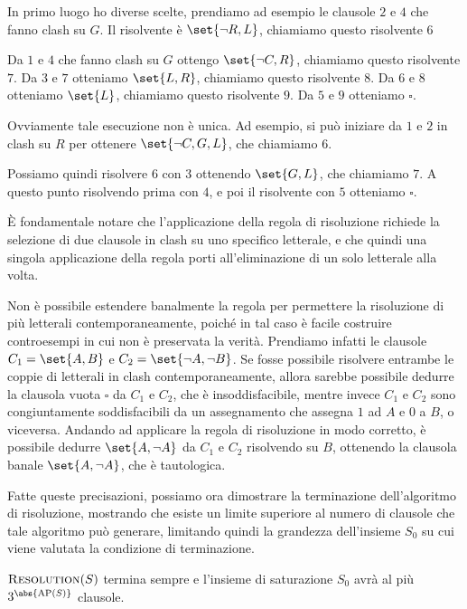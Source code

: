 \begin{example}{}
  In primo luogo ho diverse scelte, prendiamo ad esempio le clausole \(2\) e \(4\) che fanno clash su \(G\). Il risolvente è \(\set{\neg R, L}\), chiamiamo questo risolvente \(6\)

  Da \(1\) e \(4\) che fanno clash su \(G\) ottengo \(\set{\neg C, R}\), chiamiamo questo risolvente \(7\).
  Da \(3\) e \(7\) otteniamo \(\set{L, R}\), chiamiamo questo risolvente \(8\).
  Da \(6\) e \(8\) otteniamo \(\set{L}\), chiamiamo questo risolvente \(9\).
  Da \(5\) e \(9\) otteniamo \(\square\).

  Ovviamente tale esecuzione non è unica. Ad esempio, si può iniziare da \(1\) e \(2\) in clash su \(R\) per ottenere \(\set{\neg C, G, L}\), che chiamiamo \(6\).

  Possiamo quindi risolvere \(6\) con \(3\) ottenendo \(\set{G, L}\), che chiamiamo \(7\).
  A questo punto risolvendo prima con \(4\), e poi il risolvente con \(5\) otteniamo \(\square\).
\end{example}

È fondamentale notare che l'applicazione della regola di risoluzione richiede la selezione di due clausole in clash su uno specifico letterale, e che quindi una singola applicazione della regola porti all'eliminazione di un solo letterale alla volta.

Non è possibile estendere banalmente la regola per permettere la risoluzione di più letterali contemporaneamente, poiché in tal caso è facile costruire controesempi in cui non è preservata la verità. Prendiamo infatti le clausole \(C_1 = \set{A, B}\) e \(C_2 = \set{\neg A, \neg B}\). Se fosse possibile risolvere entrambe le coppie di letterali in clash contemporaneamente, allora sarebbe possibile dedurre la clausola vuota \(\square\) da \(C_1\) e \(C_2\), che è insoddisfacibile, mentre invece \(C_1\) e \(C_2\) sono congiuntamente soddisfacibili da un assegnamento che assegna \(1\) ad \(A\) e \(0\) a \(B\), o viceversa. Andando ad applicare la regola di risoluzione in modo corretto, è possibile dedurre \(\set{A,\neg A}\) da \(C_1\) e \(C_2\) risolvendo su \(B\), ottenendo la clausola banale \(\set{A, \neg A}\), che è tautologica.

Fatte queste precisazioni, possiamo ora dimostrare la terminazione dell'algoritmo di risoluzione, mostrando che esiste un limite superiore al numero di clausole che tale algoritmo può generare, limitando quindi la grandezza dell'insieme \(S_0\) su cui viene valutata la condizione di terminazione.

\begin{theorem}{}
  \(\textsc{Resolution}(S)\) termina sempre e l'insieme di saturazione \(S_0\) avrà al più \(3^{\abs{\AP[S]}}\) clausole.
\end{theorem}

